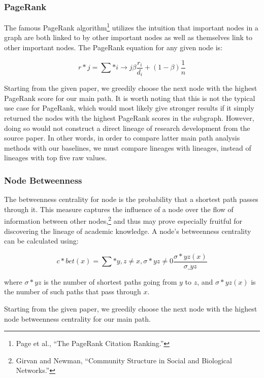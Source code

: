 \documentclass[lettepaper,]{article}
\begin{document}
\hypertarget{pagerank}{%
\subsubsection{PageRank}\label{pagerank}}

The famous PageRank algorithm\footnote{Page et al., ``The PageRank
  Citation Ranking.''} utilizes the intuition that important nodes in a
graph are both linked to by other important nodes as well as themselves
link to other important nodes. The PageRank equation for any given node
is:

\[ r*{j} = \sum*{i \rightarrow j} \beta \frac{r_i}{d_i} + (1 - \beta) \frac{1}{n} \]

Starting from the given paper, we greedily choose the next node with the
highest PageRank score for our main path. It is worth noting that this
is not the typical use case for PageRank, which would most likely give
stronger results if it simply returned the nodes with the highest
PageRank scores in the subgraph. However, doing so would not construct a
direct lineage of research development from the source paper. In other
words, in order to compare latter main path analysis methods with our
baselines, we must compare lineages with lineages, instead of lineages
with top five raw values.

\hypertarget{node-betweenness}{%
\subsubsection{Node Betweenness}\label{node-betweenness}}

The betweenness centrality for node is the probability that a shortest
path passes through it. This measure captures the influence of a node
over the flow of information between other nodes,\footnote{Girvan and
  Newman, ``Community Structure in Social and Biological Networks.''}
and thus may prove especially fruitful for discovering the lineage of
academic knowledge. A node's betweenness centrality can be calculated
using:

\[c*{bet}(x) = \sum*{y, z \neq x, \sigma*{yz} \neq 0} \frac{\sigma*{yz}(x)}{\sigma\_{yz}}\]

where \(\sigma*{yz}\) is the number of shortest paths going from \(y\)
to \(z\), and \(\sigma*{yz}(x)\) is the number of such paths that pass
through \(x\).

Starting from the given paper, we greedily choose the next node with the
highest node betweenness centrality for our main path.
\end{document}
